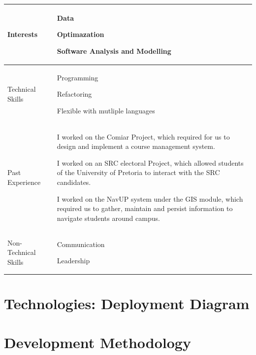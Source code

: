 \documentclass{article}
\begin{document}
\begin{center}
\begin{tabularx}{1.0\textwidth}{|p{3cm}|X|}
\hline
 {\LARGE Interests} & 
 \begin{compactitem}
     \item {\large Data}
     \item {\large Optimazation}
     \item {\large Software Analysis and Modelling}
 \end{compactitem} \\ 
 \hline
 {\LARGE Technical Skills} & 
 \begin{compactitem}
     \item {\large Programming} 
     \item {\large Refactoring}
     \item {\large Flexible with mutliple languages}
 \end{compactitem} \\ 
 \hline
 {\LARGE Past Experience} & 
 \begin{compactitem}
     \item {\large I worked on the Comiar Project, which required for us to design and implement a course management system.}
     \item {\large I worked on an SRC electoral Project, which allowed students of the University of Pretoria to interact with the SRC candidates.}
	 \item {\large I worked on the NavUP system under the GIS module, which  required us to gather, maintain and persist information to navigate students around campus.}
 \end{compactitem} \\ 
 \hline
 {\LARGE Non-Technical Skills} & 
 \begin{compactitem}
     \item {\large Communication}
     \item {\large Leadership}
 \end{compactitem} \\
 \hline 
\end{tabularx}
\end{center}
\pagebreak
\section{Technologies: Deployment Diagram}

\section{Development Methodology}
\end{document}

